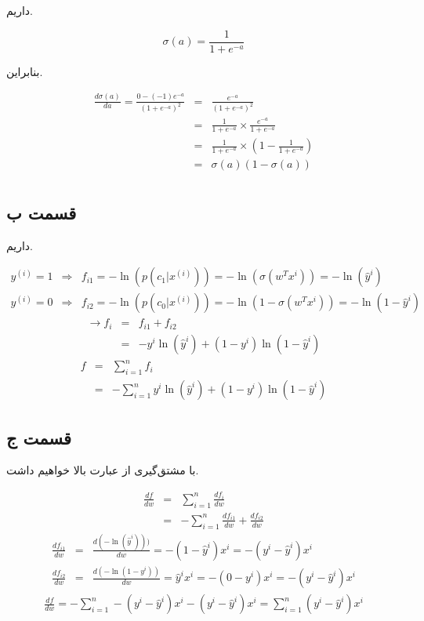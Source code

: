 \documentclass{article}
\begin{document}
داریم.

$$\sigma(a) = \frac{1}{1+e^{-a}}$$

بنابراین.

\begin{eqnarray*}
    \frac{d\sigma(a)}{da} = \frac{0-(-1)e^{-a}}{(1+e^{-a})^2} & = & \frac{e^{-a}}{(1+e^{-a})^2} \\
    & = & \frac{1}{1+e^{-a}} \times \frac{e^{-a}}{1+e^{-a}} \\
    & = & \frac{1}{1+e^{-a}} \times (1 - \frac{1}{1+e^{-a}}) \\
    & = & \sigma(a) (1-\sigma(a)) \\
\end{eqnarray*}

\subsection*{قسمت ب}

داریم.

\begin{eqnarray*}
    y^{(i)} = 1 & \Longrightarrow & f_{i1} = -\ln(p(c_1|x^{(i)})) = -\ln(\sigma(w^Tx^i)) = - \ln(\hat{y}^i) \\
    y^{(i)} = 0 & \Longrightarrow & f_{i2} = -\ln(p(c_0|x^{(i)})) = -\ln(1-\sigma(w^Tx^i)) = - \ln(1-\hat{y}^i)
\end{eqnarray*}
\begin{eqnarray*}
     \longrightarrow f_i & = & f_{i1} + f_{i2} \\
     & = & - y^i \ln(\hat{y}^i) +(1-y^i)\ln(1-\hat{y}^i)
\end{eqnarray*}
\begin{eqnarray*}
     f & = & \sum_{i=1}^{n} f_{i} \\
     & = & - \sum_{i=1}^{n} y^i \ln(\hat{y}^i) +(1-y^i)\ln(1-\hat{y}^i)
\end{eqnarray*}

\subsection*{قسمت ج}

با مشتق‌گیری از عبارت بالا خواهیم داشت.

\begin{eqnarray*}
    \frac{df}{dw} & = & \sum_{i=1}^{n} \frac{df_{i}}{dw} \\
    & = & - \sum_{i=1}^{n} \frac{df_{i1}}{dw} + \frac{df_{i2}}{dw}
\end{eqnarray*}
\begin{eqnarray*}
    \frac{df_{i1}}{dw} & = & \frac{d(-\ln(\hat{y}^i)))}{dw} = -(1-\hat{y}^i)x^i =  -(y^i - \hat{y}^i)x^i\\
    \frac{df_{i2}}{dw} & = & \frac{d(-\ln(1-y^i))}{dw} = \hat{y}^ix^i = -(0 - y^i)x^i = -(y^i - \hat{y}^i)x^i
\end{eqnarray*}
\begin{eqnarray*}
    \frac{df}{dw} = -\sum_{i=1}^{n} -(y^i - \hat{y}^i)x^i -(y^i - \hat{y}^i)x^i = \sum_{i=1}^{n} (y^i - \hat{y}^i)x^i
\end{eqnarray*}
\end{document}
